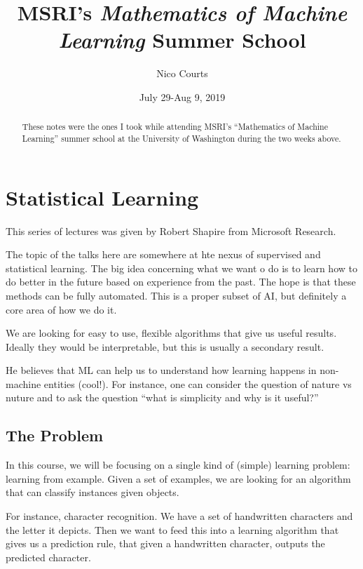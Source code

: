 \documentclass[12pt]{article}
\begin{document}
\title{MSRI's \textit{Mathematics of Machine Learning} Summer School\vspace{-1ex}}
\author{Nico Courts}
\date{July 29-Aug 9, 2019}
\maketitle

\renewcommand{\abstractname}{Introduction}
\begin{abstract}
	These notes were the ones I took while attending MSRI's ``Mathematics of Machine Learning'' summer school
	at the University of Washington during the two weeks above.
\end{abstract}

\section{Statistical Learning}
This series of lectures was given by Robert Shapire from Microsoft Research.

The topic of the talks here are somewhere at hte nexus of supervised and statistical learning. The big idea concerning what we want o do is 
to learn how to do better in the future based on experience from the past. The hope is that these methods can be fully automated. This is a proper subset of AI, 
but definitely a core area of how we do it.

We are looking for easy to use, flexible algorithms that give us useful results. Ideally they would be interpretable, but 
this is usually a secondary result.

He believes that ML can help us to understand how learning happens in non-machine entities (cool!). For instance, one can consider the question of 
nature vs nuture and to ask the question ``what is simplicity and why is it useful?''

\subsection{The Problem}
In this course, we will be focusing on a single kind of (simple) learning problem: learning from example. Given a set of examples, 
we are looking for an algorithm that can classify instances given objects.

For instance, character recognition. We have a set of handwritten characters and the letter it depicts. Then we want to feed this 
into a learning algorithm that gives us a prediction rule, that given a handwritten character, outputs the predicted character.
\end{document}
